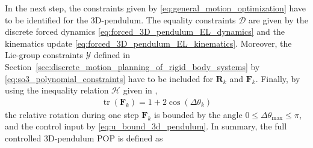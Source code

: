 In the next step, the constraints given by \eqref{eq:general_motion_optimization} have to be 
identified for the 3D-pendulum. The equality constraints $\mathcal{D}$ are given by the discrete 
forced dynamics \eqref{eq:forced_3D_pendulum_EL_dynamics} and the 
kinematics update \eqref{eq:forced_3D_pendulum_EL_kinematics}. Moreover, the
Lie-group constraints $\mathcal{Y}$ defined in Section~\ref{sec:discrete_motion_planning_of_rigid_body_systems}
by \eqref{eq:so3_polynomial_constraints} have to be included for $\bm{R}_k$ and $\bm{F}_k$.
Finally, by using the inequality relation $\mathcal{H}$ given in \cite{GallierQuaintance2020LinearAlgebra}, 
\begin{align}
    \operatorname{tr}(\bm{F}_k)=1+2\cos(\Delta\theta_k)
\end{align}
the relative rotation during one step $\bm{F}_k$ is bounded by the angle $0 \leq \Delta\theta_{\max} \leq \pi$, and
the control input by \eqref{eq:u_bound_3d_pendulum}. In summary, the full controlled 
3D-pendulum POP is defined as
\begingroup
\footnotesize
